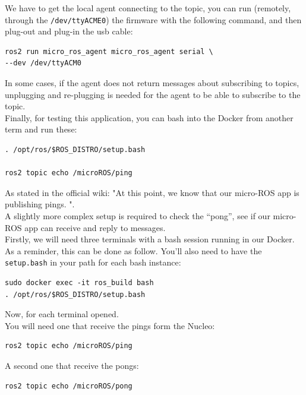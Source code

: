 \documentclass[10pt]{article}
\begin{document}
We have to get the local agent connecting to the topic, you can run (remotely, through the \verb|/dev/ttyACME0|) the firmware with the following command, and then plug-out and plug-in the usb cable:
\begin{tcolorbox}
\begin{verbatim}
ros2 run micro_ros_agent micro_ros_agent serial \
--dev /dev/ttyACM0
\end{verbatim}
\end{tcolorbox}
In some cases, if the agent does not return messages about subscribing to topics, unplugging and re-plugging is needed for the agent to be able to subscribe to the topic.\\

Finally, for testing this application, you can bash into the Docker from another term and run these:
\begin{tcolorbox}
\begin{verbatim}
. /opt/ros/$ROS_DISTRO/setup.bash

ros2 topic echo /microROS/ping
\end{verbatim}
\end{tcolorbox}
As stated in the official wiki: "At this point, we know that our micro-ROS app is publishing pings. ".\\

A slightly more complex setup is required to check the ``pong'', see if our micro-ROS app can receive and reply to messages.\\
Firstly, we will need three terminals with a bash session running in our Docker. As a reminder, this can be done as follow. You'll also need to have the \verb|setup.bash| in your path for each bash instance:
\begin{tcolorbox}
\begin{verbatim}
sudo docker exec -it ros_build bash
. /opt/ros/$ROS_DISTRO/setup.bash
\end{verbatim}
\end{tcolorbox}

Now, for each terminal opened.\\
You will need one that receive the pings form the Nucleo:
\begin{tcolorbox}
\begin{verbatim}
ros2 topic echo /microROS/ping
\end{verbatim}
\end{tcolorbox}

A second one that receive the pongs:
\begin{tcolorbox}
\begin{verbatim}
ros2 topic echo /microROS/pong
\end{verbatim}
\end{tcolorbox}
\end{document}

